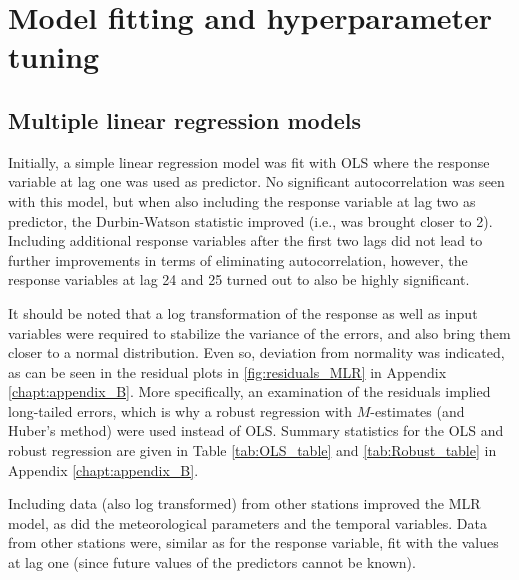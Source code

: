 \section{Model fitting and hyperparameter tuning}

\subsection{Multiple linear regression models}
Initially, a simple linear regression model was fit with OLS where the response variable at lag one was used as predictor. No significant autocorrelation was seen with this model, but when also including the response variable at lag two as predictor, the Durbin-Watson statistic improved (i.e., was brought closer to 2). Including additional response variables after the first two lags did not lead to further improvements in terms of eliminating autocorrelation, however, the response variables at lag 24 and 25 turned out to also be highly significant. 

It should be noted that a log transformation of the response as well as input variables were required to stabilize the variance of the errors, and also bring them closer to a normal distribution. Even so, deviation from normality was indicated, as can be seen in the residual plots in \cref{fig:residuals_MLR} in Appendix \ref{chapt:appendix_B}. More specifically, an examination of the residuals implied long-tailed errors, which is why a robust regression with $M$-estimates (and Huber's method) were used instead of OLS. Summary statistics for the OLS and robust regression are given in Table \ref{tab:OLS_table} and \ref{tab:Robust_table} in Appendix \ref{chapt:appendix_B}. 


Including data (also log transformed) from other stations improved the MLR model, as did the meteorological parameters and the temporal variables. Data from other stations were, similar as for the response variable, fit with the values at lag one (since future values of the predictors cannot be known). 


% 




